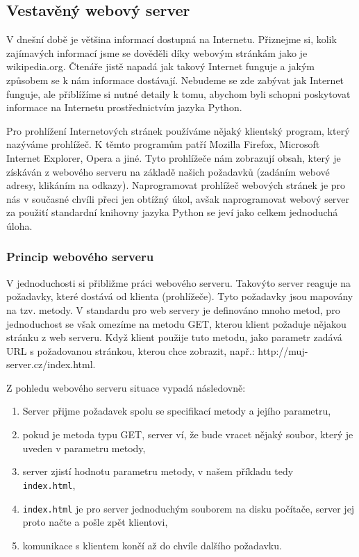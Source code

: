 \subsection{Vestavěný webový server}
V dnešní době je většina informací dostupná na Internetu. Přiznejme si, kolik zajímavých informací jsme se dověděli díky webovým stránkám jako je wikipedia.org. Čtenáře jistě napadá jak takový Internet funguje a jakým způsobem se k nám informace dostávají. Nebudeme se zde zabývat jak Internet funguje, ale přiblížíme si nutné detaily k tomu, abychom byli schopni poskytovat informace na Internetu prostřednictvím jazyka Python.

Pro prohlížení Internetových stránek používáme nějaký klientský program, který nazýváme prohlížeč. K těmto programům patří Mozilla Firefox, Microsoft Internet Explorer, Opera a jiné. Tyto prohlížeče nám zobrazují obsah, který je získáván z webového serveru na základě našich po\-ža\-da\-vků (zadáním webové adresy, klikáním na odkazy). Naprogramovat prohlížeč webových stránek je pro nás v současné chvíli přeci jen obtížný úkol, avšak naprogramovat webový server za použití standardní knihovny jazyka Python se jeví jako celkem jednoduchá úloha.

\subsubsection{Princip webového serveru}
V jednoduchosti si přibližme práci webového serveru. Takovýto server reaguje na požadavky, které dostává od klienta (prohlížeče). Tyto požadavky jsou mapovány na tzv. metody. V standardu pro web servery je definováno mnoho metod, pro jednoduchost se však omezíme na metodu GET, kterou klient požaduje nějakou stránku z web serveru. Když klient použije tuto metodu, jako parametr zadává URL s požadovanou stránkou, kterou chce zobrazit, např.: http://muj-server.cz/index.html.

Z pohledu webového serveru situace vypadá následovně:

\begin{enumerate}
\item Server přijme požadavek spolu se specifikací metody a jejího parametru,
\item pokud je metoda typu GET, server ví, že bude vracet nějaký soubor, který je uveden v parametru metody,
\item server zjistí hodnotu parametru metody, v našem příkladu tedy\\ \texttt{index.html},
\item \texttt{index.html} je pro server jednoduchým souborem na disku počítače, server jej proto načte a pošle zpět klientovi,
\item komunikace s klientem končí až do chvíle dalšího požadavku.
\end{enumerate}

